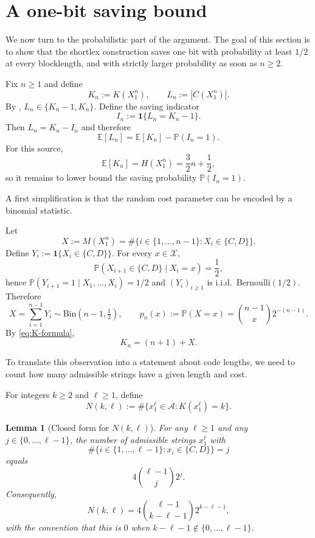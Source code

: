 \documentclass[10pt,a4paper]{article}
\newtheorem{lemma}{Lemma}
\theoremstyle{definition}
\theoremstyle{remark}
\newcommand{\1}{\mathbf{1}}
\newcommand{\PP}{\mathbb{P}}
\newcommand{\EE}{\mathbb{E}}
\begin{document}
\section{A one-bit saving bound}
We now turn to the probabilistic part of the argument. The goal of this section is to show that the shortlex construction saves one bit with probability at least $1/2$ at every blocklength, and with strictly larger probability as soon as $n\ge2$.

Fix $n\ge 1$ and define
\[
K_n:=K(X_1^n),\qquad L_n:=|C(X_1^n)|.
\]
By , $L_n\in\{K_n-1,K_n\}$. Define the saving indicator
\[
I_n:=\1\{L_n=K_n-1\}.
\]
Then $L_n=K_n-I_n$ and therefore
\begin{equation}\label{eq:Ln-decomp}
\EE[L_n]=\EE[K_n]-\PP(I_n=1).
\end{equation}
For this source,
\[
\EE[K_n]=H(X_1^n)=\frac32 n+\frac12,
\]
so it remains to lower bound the saving probability $\PP(I_n=1)$.

A first simplification is that the random cost parameter can be encoded by a binomial statistic.

Let
\[
X:=M(X_1^n)=\#\{i\in\{1,\dots,n-1\}:X_i\in\{C,D\}\}.
\]
Define $Y_i:=\1\{X_i\in\{C,D\}\}$. For every $x\in\mathcal X$,
\[
\PP(X_{i+1}\in\{C,D\}\mid X_i=x)=\frac12,
\]
hence $\PP(Y_{i+1}=1\mid X_1,\dots,X_i)=1/2$ and $(Y_i)_{i\ge1}$ is i.i.d.\ Bernoulli$(1/2)$. Therefore
\[
X=\sum_{i=1}^{n-1}Y_i\sim \mathrm{Bin}(n-1,\tfrac12),
\qquad
p_n(x):=\PP(X=x)=\binom{n-1}{x}2^{-(n-1)}.
\]
By \eqref{eq:K-formula},
\[
K_n=(n+1)+X.
\]

To translate this observation into a statement about code lengths, we need to count how many admissible strings have a given length and cost.

For integers $k\ge2$ and $\ell\ge1$, define
\[
N(k,\ell):=\#\{x_1^\ell\in\mathcal A:K(x_1^\ell)=k\}.
\]

\begin{lemma}[Closed form for $N(k,\ell)$]\label{lem:Nkl}
For any $\ell\ge1$ and any $j\in\{0,\dots,\ell-1\}$, the number of admissible strings $x_1^\ell$ with
\[
\#\{i\in\{1,\dots,\ell-1\}:x_i\in\{C,D\}\}=j
\]
equals
\[
4\binom{\ell-1}{j}2^j.
\]
Consequently,
\begin{equation}\label{eq:Nkl}
N(k,\ell)=4\binom{\ell-1}{k-\ell-1}2^{k-\ell-1},
\end{equation}
with the convention that this is $0$ when $k-\ell-1\notin\{0,\dots,\ell-1\}$.
\end{lemma}
\end{document}
